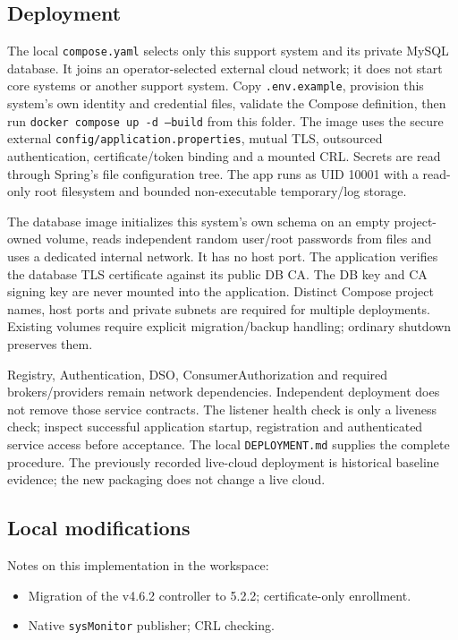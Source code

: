 \documentclass[a4paper]{arrowhead}
\begin{document}
\subsection{Deployment}

The local \texttt{compose.yaml} selects only this support system and its private MySQL database. It joins an operator-selected external cloud network; it does not start core systems or another support system. Copy \texttt{.env.example}, provision this system's own identity and credential files, validate the Compose definition, then run \texttt{docker compose up -d --build} from this folder. The image uses the secure external \texttt{config/application.properties}, mutual TLS, outsourced authentication, certificate/token binding and a mounted CRL. Secrets are read through Spring's file configuration tree. The app runs as UID 10001 with a read-only root filesystem and bounded non-executable temporary/log storage.

The database image initializes this system's own schema on an empty project-owned volume, reads independent random user/root passwords from files and uses a dedicated internal network. It has no host port. The application verifies the database TLS certificate against its public DB CA. The DB key and CA signing key are never mounted into the application. Distinct Compose project names, host ports and private subnets are required for multiple deployments. Existing volumes require explicit migration/backup handling; ordinary shutdown preserves them.

Registry, Authentication, DSO, ConsumerAuthorization and required brokers/providers remain network dependencies. Independent deployment does not remove those service contracts. The listener health check is only a liveness check; inspect successful application startup, registration and authenticated service access before acceptance. The local \texttt{DEPLOYMENT.md} supplies the complete procedure. The previously recorded live-cloud deployment is historical baseline evidence; the new packaging does not change a live cloud.

\subsection{Local modifications}
\label{sec:local}

Notes on this implementation in the workspace:
\begin{itemize}
  \item Migration of the v4.6.2 controller to 5.2.2; certificate-only enrollment.
  \item Native \texttt{sysMonitor} publisher; CRL checking.
\end{itemize}
\end{document}
